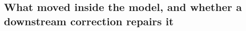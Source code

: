 \subsection{What moved inside the model, and whether a downstream correction repairs it}
\label{sec:surrogate}
%

